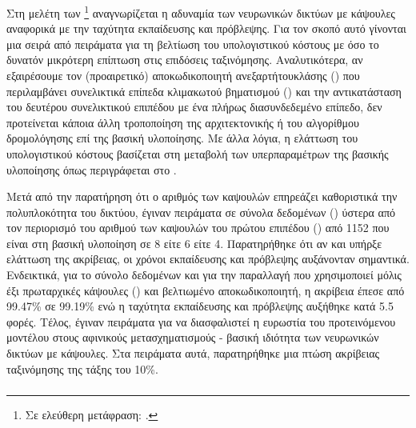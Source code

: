 \subsubsection{}

Στη μελέτη των  \footnote{Σε ελεύθερη μετάφραση: .} \cite{shiri2020quick} αναγνωρίζεται η αδυναμία των νευρωνικών δικτύων με κάψουλες αναφορικά με την ταχύτητα εκπαίδευσης και πρόβλεψης. Για τον σκοπό αυτό γίνονται μια σειρά από πειράματα για τη βελτίωση του υπολογιστικού κόστους με όσο το δυνατόν μικρότερη επίπτωση στις επιδόσεις ταξινόμησης. Αναλυτικότερα, αν εξαιρέσουμε τον (προαιρετικό) αποκωδικοποιητή ανεξαρτήτου\textendash κλάσης () που περιλαμβάνει συνελικτικά επίπεδα κλιμακωτού βηματισμού () και την αντικατάσταση του δευτέρου συνελικτικού επιπέδου με ένα πλήρως διασυνδεδεμένο επίπεδο, δεν προτείνεται κάποια άλλη τροποποίηση της αρχιτεκτονικής ή του αλγορίθμου δρομολόγησης επί της βασική υλοποίησης. Με άλλα λόγια, η ελάττωση του υπολογιστικού κόστους βασίζεται στη μεταβολή των υπερπαραμέτρων της βασικής υλοποίησης όπως περιγράφεται στο \cite{sabour2017dynamic}. 

Μετά από την παρατήρηση ότι ο αριθμός των καψουλών επηρεάζει καθοριστικά την πολυπλοκότητα του δικτύου, έγιναν πειράματα σε σύνολα δεδομένων () ύστερα από τον περιορισμό του αριθμού των καψουλών του πρώτου επιπέδου () από 1152 που είναι στη βασική υλοποίηση σε 8 είτε 6 είτε 4. Παρατηρήθηκε ότι αν και υπήρξε ελάττωση της ακρίβειας, οι χρόνοι εκπαίδευσης και πρόβλεψης αυξάνονταν σημαντικά. Ενδεικτικά, για το σύνολο δεδομένων  και για την παραλλαγή που χρησιμοποιεί μόλις έξι πρωταρχικές κάψουλες () και βελτιωμένο αποκωδικοποιητή, η ακρίβεια έπεσε από 99.47\% σε 99.19\% ενώ η ταχύτητα εκπαίδευσης και πρόβλεψης αυξήθηκε κατά 5.5 φορές. Τέλος, έγιναν πειράματα για να διασφαλιστεί η ευρωστία του προτεινόμενου μοντέλου στους αφινικούς μετασχηματισμούς - βασική ιδιότητα των νευρωνικών δικτύων με κάψουλες. Στα πειράματα αυτά, παρατηρήθηκε μια πτώση ακρίβειας ταξινόμησης της τάξης του 10\%.

\subsubsection{}


